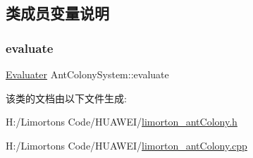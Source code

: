 \subsection{类成员变量说明}
\mbox{\label{class_ant_colony_system_a9445ee19c15eb281300ea0476733edac}} 
\subsubsection{\texorpdfstring{evaluate}{evaluate}}
{\footnotesize\ttfamily \hyperlink{struct_evaluater}{Evaluater} Ant\+Colony\+System\+::evaluate}



该类的文档由以下文件生成\+:\begin{DoxyCompactItemize}
\item 
H\+:/\+Limorton\textquotesingle{}s Code/\+H\+U\+A\+W\+E\+I/\hyperlink{limorton__ant_colony_8h}{limorton\+\_\+ant\+Colony.\+h}\item 
H\+:/\+Limorton\textquotesingle{}s Code/\+H\+U\+A\+W\+E\+I/\hyperlink{limorton__ant_colony_8cpp}{limorton\+\_\+ant\+Colony.\+cpp}\end{DoxyCompactItemize}
